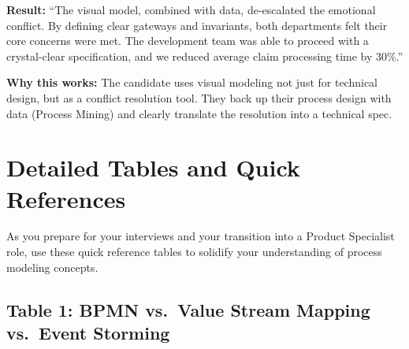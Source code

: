\documentclass[
  11pt,
  openany,
  oneside]{book}
\renewenvironment{quote}{\begin{customquote}}{\end{customquote}}
\begin{document}
\textbf{Result:} ``The visual model, combined with data, de-escalated
the emotional conflict. By defining clear gateways and invariants, both
departments felt their core concerns were met. The development team was
able to proceed with a crystal-clear specification, and we reduced
average claim processing time by 30\%.''

\begin{quote}
\textbf{Why this works:} The candidate uses visual modeling not just for
technical design, but as a conflict resolution tool. They back up their
process design with data (Process Mining) and clearly translate the
resolution into a technical spec.
\end{quote}

\bigskip

\section{Detailed Tables and Quick
References}\label{detailed-tables-and-quick-references}

As you prepare for your interviews and your transition into a Product
Specialist role, use these quick reference tables to solidify your
understanding of process modeling concepts.

\subsection{Table 1: BPMN vs.~Value Stream Mapping vs.~Event
Storming}\label{table-1-bpmn-vs.-value-stream-mapping-vs.-event-storming}
\end{document}
